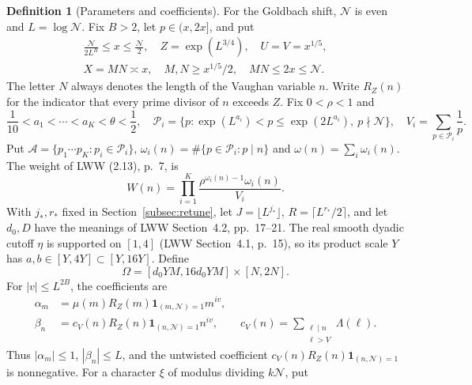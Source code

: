 \documentclass[11pt]{article}
\theoremstyle{definition}
\newtheorem{definition}[theorem]{Definition}
\newcommand{\ind}{\mathbf 1}
\newcommand{\GN}{\mathcal N}
\newcommand{\Aset}{\mathcal A}
\theoremstyle{remark}
\numberwithin{equation}{section}
\begin{document}
\begin{definition}[Parameters and coefficients]\label{def:parameters}
For the Goldbach shift, $\GN$ is even and $L=\log\GN$.
Fix $B>2$, let $p\in(x,2x]$, and put
\begin{equation}\label{eq:ranges}
 \begin{gathered}
 \frac{\GN}{2L^B}\le x\le\frac{\GN}2,\quad
 Z=\exp(L^{3/4}),\quad U=V=x^{1/5},\\
 X=MN\asymp x,\quad M,N\ge x^{1/5}/2,\quad MN\le2x\le\GN.
 \end{gathered}
\end{equation}
The letter $N$ always denotes the length of the Vaughan variable $n$.
Write $R_Z(n)$ for the indicator that every prime divisor of $n$
exceeds $Z$. Fix $0<\rho<1$ and
\begin{equation}\label{eq:bands}
 \frac1{10}<a_1<\cdots<a_K<\theta<\frac12,\quad
 \mathcal P_i=\{p:\exp(L^{a_i})<p\le\exp(2L^{a_i}),\ p\nmid\GN\},
 \quad V_i=\sum_{p\in\mathcal P_i}\frac1p.
\end{equation}
Put $\Aset=\{p_1\cdots p_K:p_i\in\mathcal P_i\}$,
$\omega_i(n)=\#\{p\in\mathcal P_i:p\mid n\}$ and
$\omega(n)=\sum_i\omega_i(n)$. The weight of LWW (2.13), p.~7, is
\begin{equation}\label{eq:weight}
 W(n)=\prod_{i=1}^K\frac{\rho^{\omega_i(n)-1}\omega_i(n)}{V_i}.
\end{equation}
With $j_*,r_*$ fixed in Section~\ref{subsec:retune}, let $J=\lfloor L^{j_*}\rfloor$, $R=\lceil L^{r_*}/2\rceil$,
and let $d_0,D$ have the meanings of LWW Section~4.2, pp.~17--21.
The real smooth dyadic cutoff $\eta$ is supported on $[1,4]$
(LWW Section~4.1, p.~15), so its product scale $Y$ has
$a,b\in[Y,4Y]\subset[Y,16Y]$. Define
\begin{equation}\label{eq:rectangle}
 \Omega=[d_0YM,16d_0YM]\times[N,2N].
\end{equation}
For $|v|\le L^{2B}$, the coefficients are
\begin{equation}\label{eq:coefficients}
 \begin{split}
 \alpha_m&=\mu(m)R_Z(m)\ind_{(m,\GN)=1}m^{iv},\\
 \beta_n&=c_V(n)R_Z(n)\ind_{(n,\GN)=1}n^{iv},\qquad
 c_V(n)=\sum_{\substack{\ell\mid n\\\ell>V}}\Lambda(\ell).
 \end{split}
\end{equation}
Thus $|\alpha_m|\le1$, $|\beta_n|\le L$, and the untwisted
coefficient $c_V(n)R_Z(n)\ind_{(n,\GN)=1}$ is nonnegative.
For a character $\xi$ of modulus dividing $k\GN$, put

\end{definition}
\end{document}

